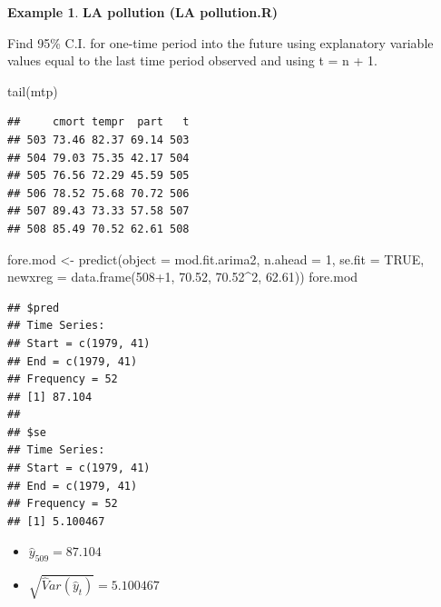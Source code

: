 \documentclass[
]{book}
\newenvironment{Shaded}{\begin{snugshade}}{\end{snugshade}}
\newcommand{\AttributeTok}[1]{\textcolor[rgb]{0.77,0.63,0.00}{#1}}
\newcommand{\ConstantTok}[1]{\textcolor[rgb]{0.00,0.00,0.00}{#1}}
\newcommand{\DecValTok}[1]{\textcolor[rgb]{0.00,0.00,0.81}{#1}}
\newcommand{\FloatTok}[1]{\textcolor[rgb]{0.00,0.00,0.81}{#1}}
\newcommand{\FunctionTok}[1]{\textcolor[rgb]{0.00,0.00,0.00}{#1}}
\newcommand{\NormalTok}[1]{#1}
\newcommand{\OtherTok}[1]{\textcolor[rgb]{0.56,0.35,0.01}{#1}}
\newcommand{\SpecialCharTok}[1]{\textcolor[rgb]{0.00,0.00,0.00}{#1}}
\theoremstyle{definition}
\theoremstyle{definition}
\newtheorem{example}{Example}[chapter]
\theoremstyle{definition}
\theoremstyle{definition}
\theoremstyle{remark}
\begin{document}
\begin{example}
\textbf{LA pollution (LA pollution.R)}

Find 95\% C.I. for one-time period into the future using explanatory variable values equal to the last time period observed and using t = n + 1.

\begin{Shaded}
\begin{Highlighting}[]
\FunctionTok{tail}\NormalTok{(mtp)}
\end{Highlighting}
\end{Shaded}

\begin{verbatim}
##     cmort tempr  part   t
## 503 73.46 82.37 69.14 503
## 504 79.03 75.35 42.17 504
## 505 76.56 72.29 45.59 505
## 506 78.52 75.68 70.72 506
## 507 89.43 73.33 57.58 507
## 508 85.49 70.52 62.61 508
\end{verbatim}

\begin{Shaded}
\begin{Highlighting}[]
\NormalTok{fore.mod }\OtherTok{\textless{}{-}} \FunctionTok{predict}\NormalTok{(}\AttributeTok{object =}\NormalTok{ mod.fit.arima2, }\AttributeTok{n.ahead =} \DecValTok{1}\NormalTok{, }
    \AttributeTok{se.fit =} \ConstantTok{TRUE}\NormalTok{, }\AttributeTok{newxreg =} \FunctionTok{data.frame}\NormalTok{(}\DecValTok{508}\SpecialCharTok{+}\DecValTok{1}\NormalTok{, }\FloatTok{70.52}\NormalTok{, }
    \FloatTok{70.52}\SpecialCharTok{\^{}}\DecValTok{2}\NormalTok{, }\FloatTok{62.61}\NormalTok{))}
\NormalTok{fore.mod}
\end{Highlighting}
\end{Shaded}

\begin{verbatim}
## $pred
## Time Series:
## Start = c(1979, 41) 
## End = c(1979, 41) 
## Frequency = 52 
## [1] 87.104
## 
## $se
## Time Series:
## Start = c(1979, 41) 
## End = c(1979, 41) 
## Frequency = 52 
## [1] 5.100467
\end{verbatim}

\begin{itemize}
\item
  \(\hat y_{509}=87.104\)
\item
  \(\sqrt{\hat Var(\hat y_t)}=5.100467\)
\end{itemize}


\end{example}
\end{document}
